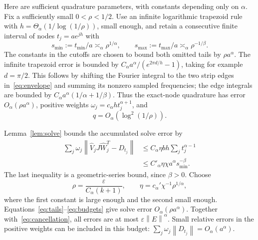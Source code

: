 \documentclass[11pt]{article}
\newcommand{\norm}[1]{\left\lVert#1\right\rVert}
\begin{document}
Here are sufficient quadrature parameters, with constants depending
only on $\alpha$. Fix a sufficiently small $0<\rho<1/2$.
Use an infinite logarithmic trapezoid rule with
$h=\Theta_\alpha(1/\log(1/\rho))$, small enough, and retain a consecutive
finite interval of nodes $t_j=ae^{jh}$ with
\begin{equation}\label{eq:tails}
 s_{\min}:=t_{\min}/a\asymp_\alpha\rho^{1/\alpha},\qquad
 s_{\max}:=t_{\max}/a\asymp_\alpha\rho^{-1/\beta}.
\end{equation}
The constants in the cutoffs are chosen to bound both omitted tails
by $\rho a^\alpha$. The infinite trapezoid error is bounded by
$C_\alpha a^\alpha/(e^{2\pi d/h}-1)$, taking for example $d=\pi/2$.
This follows by shifting the Fourier integral to the two strip edges
in~\eqref{eq:envelope} and summing its nonzero sampled frequencies;
the edge integrals are bounded by
$C_\alpha a^\alpha(1/\alpha+1/\beta)$.
Thus the exact-node quadrature has error $O_\alpha(\rho a^\alpha)$,
positive weights
$\omega_j=c_\alpha h t_j^{\alpha+1}$, and
\begin{equation}\label{eq:q}
 q=O_\alpha(\log^2(1/\rho)).
\end{equation}

Lemma~\ref{lem:solve} bounds the accumulated solve error by
\begin{align*}
 \sum_j\omega_j\norm{\widehat V_jJ\widehat W_j^T-D_{t_j}}
 &\le C_\alpha\eta b h\sum_jt_j^{\alpha-1}\\
 &\le C'_\alpha\eta\chi a^\alpha s_{\min}^{-\beta}.
\end{align*}
The last inequality is a geometric-series bound, since $\beta>0$.
Choose
\begin{equation}\label{eq:budgets}
 \rho=\frac{\varepsilon}{C_\alpha(k+1)},\qquad
 \eta=c_\alpha'\chi^{-1}\rho^{1/\alpha},
\end{equation}
where the first constant is large enough and the second small enough.
Equations~\eqref{eq:tails}--\eqref{eq:budgets} give solve error
$O_\alpha(\rho a^\alpha)$. Together with~\eqref{eq:cancellation}, all
errors are at most $\varepsilon\norm E^\alpha$.
Small relative errors in the positive weights can be included in this
budget: $\sum_j\omega_j\norm{D_{t_j}}=O_\alpha(a^\alpha)$.
\end{document}
